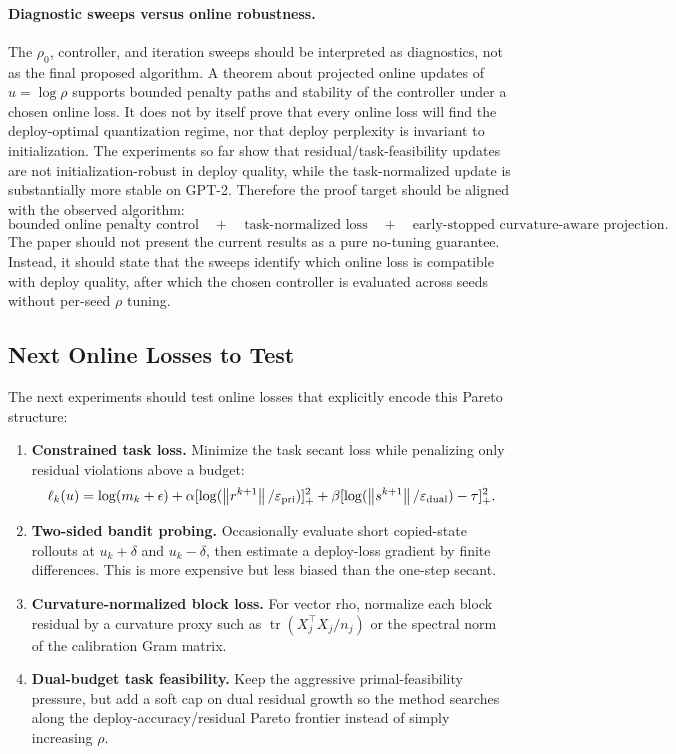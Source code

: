 \documentclass[11pt]{article}
\newcommand{\norm}[1]{\left\lVert #1 \right\rVert}
\begin{document}
\paragraph{Diagnostic sweeps versus online robustness.}
The \(\rho_0\), controller, and iteration sweeps should be interpreted as
diagnostics, not as the final proposed algorithm.  A theorem about projected
online updates of \(u=\log\rho\) supports bounded penalty paths and stability
of the controller under a chosen online loss.  It does not by itself prove that
every online loss will find the deploy-optimal quantization regime, nor that
deploy perplexity is invariant to initialization.  The experiments so far show
that residual/task-feasibility updates are not initialization-robust in deploy
quality, while the task-normalized update is substantially more stable on
GPT-2.  Therefore the proof target should be aligned with the observed
algorithm:
\[
    \text{bounded online penalty control}
    \quad+\quad
    \text{task-normalized loss}
    \quad+\quad
    \text{early-stopped curvature-aware projection.}
\]
The paper should not present the current results as a pure no-tuning guarantee.
Instead, it should state that the sweeps identify which online loss is
compatible with deploy quality, after which the chosen controller is evaluated
across seeds without per-seed \(\rho\) tuning.

\subsection{Next Online Losses to Test}

The next experiments should test online losses that explicitly encode this
Pareto structure:
\begin{enumerate}
    \item \textbf{Constrained task loss.}  Minimize the task secant loss while
    penalizing only residual violations above a budget:
    \[
        \ell_k(u)=\log(m_k+\epsilon)
        +\alpha [\log(\norm{r^{k+1}}/\varepsilon_{\rm pri})]_+^2
        +\beta [\log(\norm{s^{k+1}}/\varepsilon_{\rm dual})-\tau]_+^2.
    \]
    \item \textbf{Two-sided bandit probing.}  Occasionally evaluate short
    copied-state rollouts at \(u_k+\delta\) and \(u_k-\delta\), then estimate
    a deploy-loss gradient by finite differences.  This is more expensive but
    less biased than the one-step secant.
    \item \textbf{Curvature-normalized block loss.}  For vector rho, normalize
    each block residual by a curvature proxy such as
    \(\operatorname{tr}(X_j^\top X_j/n_j)\) or the spectral norm of the
    calibration Gram matrix.
    \item \textbf{Dual-budget task feasibility.}  Keep the aggressive
    primal-feasibility pressure, but add a soft cap on dual residual growth so
    the method searches along the deploy-accuracy/residual Pareto frontier
    instead of simply increasing \(\rho\).
\end{enumerate}
\end{document}
